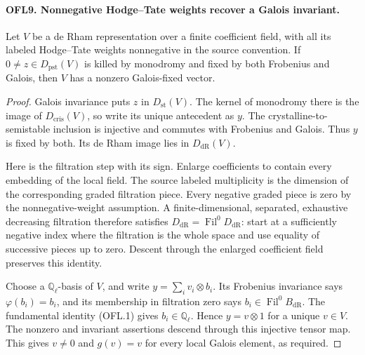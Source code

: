 \paragraph{OFL9. Nonnegative Hodge--Tate weights recover a Galois invariant.}
\label{claim:OFL9}
Let \(V\) be a de Rham representation over a finite coefficient
field, with all its labeled Hodge--Tate weights nonnegative in the
source convention.  If \(0\ne z\in D_{\mathrm{pst}}(V)\)
is killed by monodromy and fixed by both Frobenius and Galois, then
\(V\) has a nonzero Galois-fixed vector.
\begin{proof}
Galois invariance puts \(z\) in \(D_{\mathrm{st}}(V)\).
The kernel of monodromy there is the image of
\(D_{\mathrm{cris}}(V)\), so write its unique antecedent as
\(y\).  The crystalline-to-semistable inclusion is injective and
commutes with Frobenius and Galois.  Thus \(y\) is fixed by both.
Its de Rham image lies in \(D_{\mathrm{dR}}(V)\).

Here is the filtration step with its sign.  Enlarge coefficients
to contain every embedding of the local field.  The source labeled
multiplicity is the dimension of the corresponding graded
filtration piece.  Every negative graded piece is zero by the
nonnegative-weight assumption.  A finite-dimensional, separated,
exhaustive decreasing filtration therefore satisfies
\(D_{\mathrm{dR}}=\operatorname{Fil}^0D_{\mathrm{dR}}\):
start at a sufficiently negative index where the filtration is the
whole space and use equality of successive pieces up to zero.
Descent through the enlarged coefficient field preserves this
identity.

Choose a \(\mathbb Q_\ell\)-basis of \(V\), and write
\(y=\sum_i v_i\otimes b_i\).  Its Frobenius invariance says
\(\varphi(b_i)=b_i\), and its membership in filtration zero
says \(b_i\in\operatorname{Fil}^0B_{\mathrm{dR}}\).
The fundamental identity (OFL.1) gives \(b_i\in\mathbb Q_\ell\).
Hence \(y=v\otimes1\) for a unique \(v\in V\).
The nonzero and invariant assertions descend through this injective
tensor map.  This gives \(v\ne0\) and \(g(v)=v\) for every
local Galois element, as required.
\end{proof}

